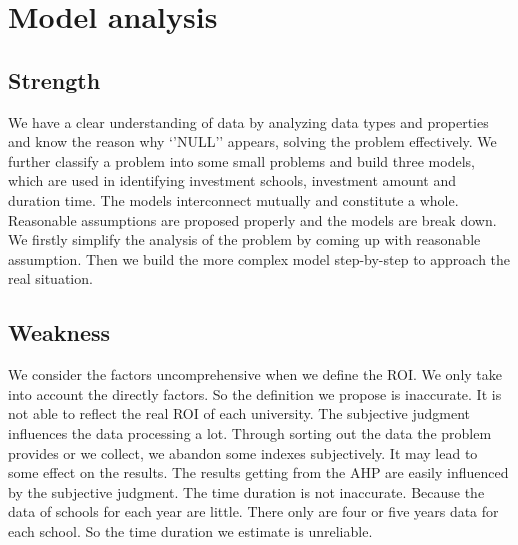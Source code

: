 \section{Model analysis}
\subsection{Strength}
We have a clear understanding of data by analyzing data types and properties and know the reason why ‘’NULL’’ appears, solving the problem effectively.
We further classify a problem into some small problems and build three models, which are used in identifying investment schools, investment amount and duration time. The models interconnect mutually and constitute a whole. 
Reasonable assumptions are proposed properly and the models are break down. We firstly simplify the analysis of the problem by coming up with reasonable assumption. Then we build the more complex model step-by-step to approach the real situation.

\subsection{Weakness}
We consider the factors uncomprehensive when we define the ROI. We only take into account the directly factors. So the definition we propose is inaccurate. It is not able to reflect the real ROI of each university.
The subjective judgment influences the data processing a lot. Through sorting out the data the problem provides or we collect, we abandon some indexes subjectively. It may lead to some effect on the results.
The results getting from the AHP are easily influenced by the subjective judgment. 
The time duration is not inaccurate. Because the data of schools for each year are little. There only are four or five years data for each school. So the time duration we estimate is unreliable.
